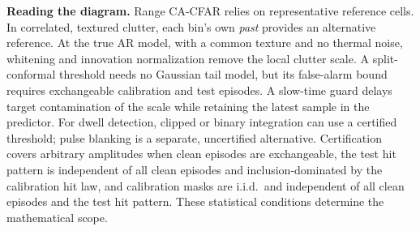 \documentclass[10pt]{article}
\begin{document}
\begin{center}
\end{center}

\medskip
\noindent\small\textbf{Reading the diagram.} Range CA-CFAR relies on representative reference cells. In correlated, textured clutter, each bin's own \emph{past} provides an alternative reference. At the true AR model, with a common texture and no thermal noise, whitening and innovation normalization remove the local clutter scale. A split-conformal threshold needs no Gaussian tail model, but its false-alarm bound requires exchangeable calibration and test episodes. A slow-time guard delays target contamination of the scale while retaining the latest sample in the predictor. For dwell detection, clipped or binary integration can use a certified threshold; pulse blanking is a separate, uncertified alternative. Certification covers arbitrary amplitudes when clean episodes are exchangeable, the test hit pattern is independent of all clean episodes and inclusion-dominated by the calibration hit law, and calibration masks are i.i.d.\ and independent of all clean episodes and the test hit pattern. These statistical conditions determine the mathematical scope.
\end{document}
